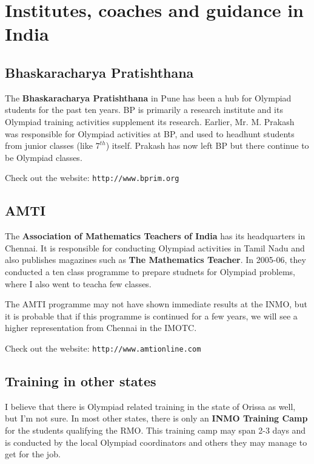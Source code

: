 \documentclass[a4paper]{amsart}
\begin{document}
\section{Institutes, coaches and guidance in India}

\subsection{Bhaskaracharya Pratishthana}

The {\bf Bhaskaracharya Pratishthana} in Pune has been a hub for Olympiad students for the past ten years. 
BP is primarily a research institute and its Olympiad training activities supplement its research.
Earlier, Mr. M. Prakash
was responsible for Olympiad activities at BP, and used to headhunt students from junior classes (like $7^{th}$) itself.
Prakash has now left BP but there continue to be Olympiad classes.

Check out the website: {\tt http://www.bprim.org}

\subsection{AMTI}

The {\bf Association of Mathematics Teachers of India} has its headquarters in Chennai. It is responsible for conducting Olympiad
activities in Tamil Nadu and also publishes magazines such as {\bf The Mathematics Teacher}. In 2005-06, they conducted a ten class
programme to prepare studnets for Olympiad problems, where I also went to teacha few classes.

The AMTI programme may not have shown immediate results at the INMO, but it is probable 
that if this programme is continued for a few years,
we will see a higher representation from Chennai in the IMOTC.

Check out the website: {\tt http://www.amtionline.com}

\subsection{Training in other states}

I believe that there is Olympiad related training in the state of Orissa as well, but I'm not sure. In most other states,
there is only an {\bf INMO Training Camp} for the students qualifying the RMO. This training camp may span 2-3 days
and is conducted by the local Olympiad coordinators and others they may manage to get for the job. 
\end{document}
